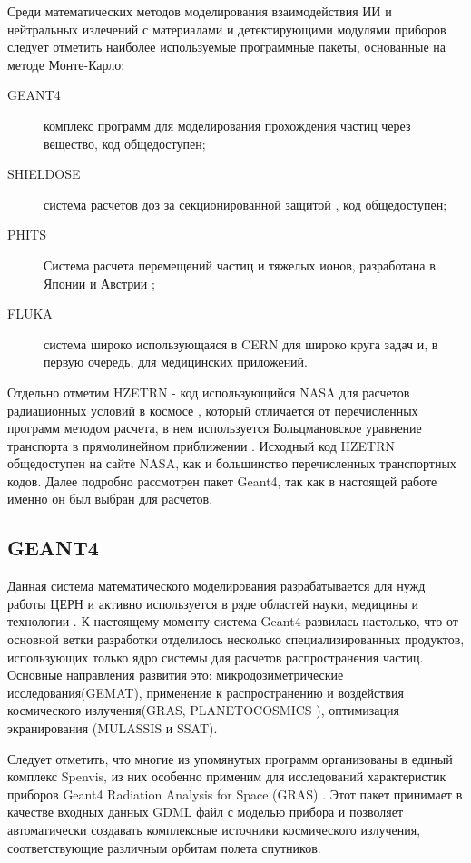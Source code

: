 Среди математических методов моделирования взаимодействия ИИ и нейтральных излечений с материалами и детектирующими модулями приборов следует отметить наиболее используемые программные пакеты, основанные на методе Монте-Карло:


\begin{description}
	\item[GEANT4] комплекс программ для моделирования прохождения частиц через вещество\cite{Allison2006},  код общедоступен;
	\item[SHIELDOSE ] система расчетов доз за секционированной защитой \cite{SeltzerS.M.1980},  код общедоступен;
	\item[PHITS] Система расчета перемещений частиц и тяжелых ионов, 
	разработана в Японии и Австрии \cite{Niita2006, Sato2006} ;
	\item[FLUKA] система широко использующаяся в CERN для широко круга задач и, в первую очередь, для медицинских приложений\cite{Fasso2003, fluka2014}.
\end{description}

Отдельно отметим HZETRN - код использующийся NASA для расчетов радиационных условий в космосе \cite{Heinbockel2009}, который отличается от перечисленных программ методом расчета, в нем используется Больцмановское уравнение транспорта в прямолинейном приближении \cite{Wilson1995}. Исходный код HZETRN общедоступен на сайте NASA, как и большинство перечисленных транспортных кодов. Далее подробно рассмотрен  пакет Geant4, так как в настоящей работе именно он был выбран для расчетов. 


\subsection{GEANT4}

Данная система математического моделирования разрабатывается для нужд работы 
ЦЕРН и активно используется в ряде областей науки, медицины и технологии 
\cite{Agostinelli2003}.
К настоящему моменту система Geant4 развилась настолько, что от основной ветки 
разработки отделилось несколько специализированных продуктов, использующих 
только ядро системы для расчетов распространения частиц. Основные направления 
развития это: микродозиметрические исследования(GEMAT), применение к 
распространению и 
воздействия космического излучения(GRAS, PLANETOCOSMICS ), оптимизация 
экранирования (MULASSIS \cite{Lei2002} и SSAT). 

Следует отметить, что многие из упомянутых программ организованы в единый комплекс Spenvis, из них особенно применим для исследований характеристик приборов  Geant4 Radiation Analysis for Space (GRAS) \cite{Santin2005}. Этот пакет принимает в качестве входных данных GDML файл с моделью прибора и позволяет автоматически создавать комплексные источники космического излучения, соответствующие различным орбитам полета спутников.

